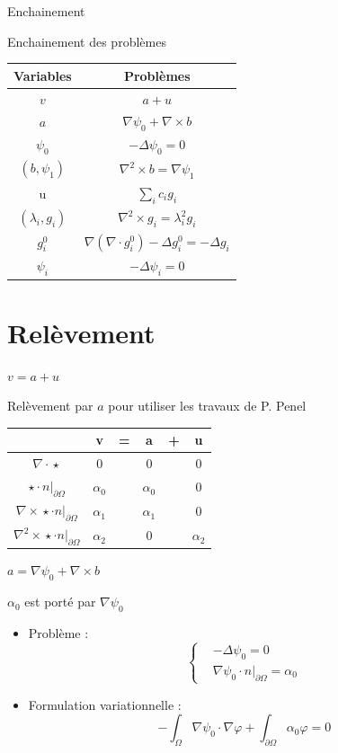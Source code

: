 \documentclass{beamer}
\newcommand{\grad}{{\nabla}}
\newcommand{\laplace}{{\Delta}}
\newcommand{\rot}{{\nabla\times}}
\newcommand{\rott}{{\nabla^2\times}}
\newcommand{\diverg}{{\nabla\cdot}}
\newcommand{\restr}{{\big\rvert_{\partial\Omega}}}
\begin{document}
\begin{frame}{Enchainement}
\begin{block}{Enchainement des problèmes}
\begin{center}
\begin{tabular}{|c|c|}
\hline
Variables & Problèmes\\ \hline
$v$ & $a + u$ \\ \hline
$a$ & $\grad\psi_0 + \rot b$\\ \hline
$\psi_0$ & $-\laplace\psi_0 = 0$\\ \hline
$(b,\psi_1)$ & $\rott b= \grad\psi_1$ \\ \hline
u & $\sum_i c_ig_i$ \\ \hline
$(\lambda_i,g_i)$ & $\rott  g_i = \lambda_i^2 g_i$ \\ \hline
$g_i^0$ & $\grad(\diverg g_i^0) - \laplace g_i^0 = - \laplace g_i$\\ \hline
$\psi_i$ & $-\laplace \psi_i = 0$\\ \hline
\end{tabular}
\end{center}
\end{block}
\end{frame}

\section{Relèvement}
\begin{frame}{$v=a+u$}
\begin{block}{Relèvement par $a$ pour utiliser les travaux de P. Penel}
\begin{center}
\begin{tabular}{c|ccccc}
& v & = & a & + & u \\ \hline
$\diverg\star$ & 0 & & 0 & & 0\\ \hline
$\star\cdot n\restr$ & $\alpha_0$ & & $\alpha_0$ & & 0\\ \hline
$\rot\star\cdot n\restr$ & $\alpha_1$ & & $\alpha_1$ & & 0\\\hline
$\rott\star\cdot n\restr$ & $\alpha_2$ & & 0 & & $\alpha_2$ 
\end{tabular}
\end{center}
\end{block}
\end{frame}

\begin{frame}{$a=\grad\psi_0+\rot b$}
\begin{block}{$\alpha_0$ est porté par $\grad\psi_0$}
\begin{itemize}
\item Problème :
\[\left\{
\begin{aligned}
&-\laplace\psi_0 = 0\\
&\grad\psi_0\cdot n\restr=\alpha_0
\end{aligned}
\right.\]
\item Formulation variationnelle :
\[
-\int_\Omega \grad\psi_0\cdot\grad\varphi + \int_{\partial\Omega} \alpha_0\varphi = 0
\]
\end{itemize}
\end{block}
\end{frame}
\end{document}
